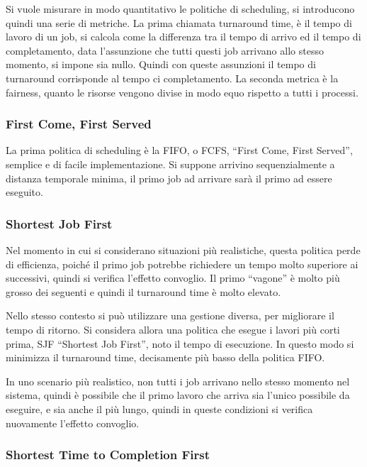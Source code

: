 \documentclass{article}
\numberwithin{equation}{subsection}
\begin{document}
Si vuole misurare in modo quantitativo le politiche di scheduling, si introducono quindi una serie di metriche. La prima chiamata turnaround time, è il tempo di 
lavoro di un job, si calcola come la differenza tra il tempo di arrivo ed il tempo di completamento, data l'assunzione che tutti questi job arrivano allo stesso momento, 
si impone sia nullo. Quindi con queste assunzioni il tempo di turnaround corrisponde al tempo ci completamento. 
La seconda metrica è la fairness, quanto le risorse vengono divise in modo equo rispetto a tutti i processi. 

\subsubsection{First Come, First Served}

La prima politica di scheduling è la FIFO, o FCFS, ``First Come, First Served'', semplice e di facile implementazione. Si suppone arrivino sequenzialmente a distanza 
temporale minima, il primo job ad arrivare sarà il primo ad essere eseguito. 


\subsubsection{Shortest Job First}

Nel momento in cui si considerano situazioni più realistiche, questa politica perde di efficienza, poiché il primo job potrebbe richiedere un tempo molto superiore ai 
successivi, quindi si verifica l'effetto convoglio. Il primo ``vagone'' è molto più grosso dei seguenti e quindi il turnaround time è molto elevato. 

Nello stesso contesto si può utilizzare una gestione diversa, per migliorare il tempo di ritorno. Si considera allora una politica che esegue i lavori più corti prima, 
SJF ``Shortest Job First'', noto il tempo di esecuzione. In questo modo si minimizza il turnaround time, decisamente più basso della politica FIFO. 

In uno scenario più realistico, non tutti i job  arrivano nello stesso momento nel sistema, quindi è possibile che il primo lavoro che arriva sia l'unico possibile da 
eseguire, e sia anche il più lungo, quindi in queste condizioni si verifica nuovamente l'effetto convoglio. 

\subsubsection{Shortest Time to Completion First}
\end{document}
